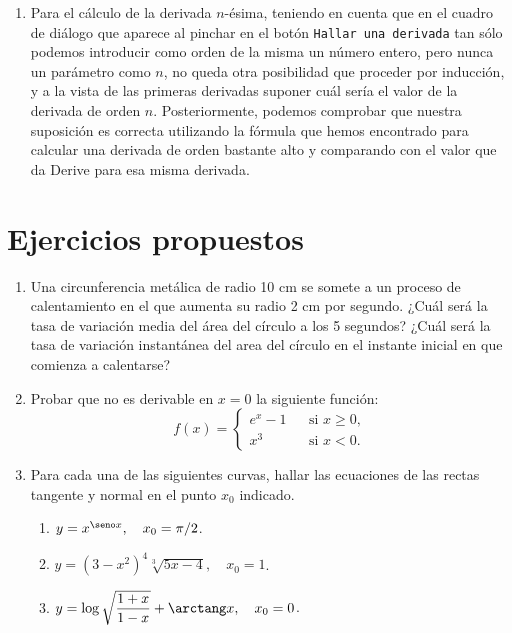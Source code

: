 \begin{enumerate}[leftmargin=*]
\begin{indication}
{\begin{enumerate}
\item Para el cálculo de la derivada $n$-ésima, teniendo en cuenta
que en el cuadro de diálogo que aparece al pinchar en el botón
\texttt{Hallar una derivada} tan sólo podemos introducir como
orden de la misma un número entero, pero nunca un parámetro como
$n$, no queda otra posibilidad que proceder por inducción, y a la
vista de las primeras derivadas suponer cuál sería el valor de la
derivada de orden $n$. Posteriormente, podemos comprobar que
nuestra suposición es correcta utilizando la fórmula que hemos
encontrado para calcular una derivada de orden bastante alto y
comparando con el valor que da Derive para esa misma derivada.

\end{enumerate}
}
\end{indication}


\end{enumerate}

\section{Ejercicios propuestos}
\begin{enumerate}[leftmargin=*]

\item Una circunferencia metálica de radio 10 cm  se somete a un proceso de calentamiento en el que aumenta su radio 2 cm por segundo. ¿Cuál será la tasa de variación media del área del círculo a los 5 segundos? ¿Cuál será la tasa de variación instantánea del area del círculo en el instante inicial en que comienza a calentarse?

\item  Probar que no es derivable en $x=0$ la siguiente función:
\[ f(x)=\left\{
\begin{array}{ccl}
    e^x-1 &  & \mbox{si } x\geq 0,  \\
    x^3 &  & \mbox{si } x<0.
\end{array}\right.
\]

\item  Para cada una de las siguientes curvas, hallar las ecuaciones
de las rectas tangente y normal en el punto $x_{0}$ indicado.
\begin{enumerate}
    \item  $y=x^{\seno x},\quad x_{0}=\pi/2$.

    \item  $y=(3-x^2)^4\sqrt[3]{5x-4},\quad x_{0}=1$.

    \item  $y=\log \sqrt{\dfrac{1+x}{1-x}}+\arctang x, \quad x_{0}=0$.
\end{enumerate}

\end{enumerate}

